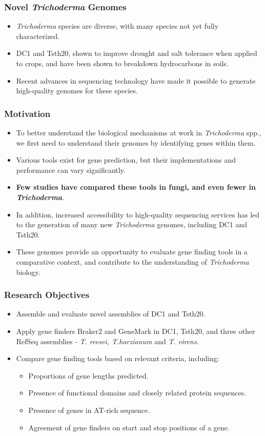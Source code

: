 \documentclass[t]{beamer}
\begin{document}
\begin{frame}
	\frametitle{Novel \textit{Trichoderma} Genomes}
	\begin{itemize}
		\item \textit{Trichoderma} species are diverse, with many species not yet fully characterized.
		\item DC1 and Tsth20, shown to improve drought and salt tolerance when applied to crops, and have been shown to breakdown hydrocarbons in soils.
		\item Recent advances in sequencing technology have made it possible to generate high-quality genomes for these species.
	\end{itemize}
\end{frame}

\begin{frame}
	\frametitle{Motivation} 
	\begin{itemize}
		\item To better understand the biological mechanisms at work in \textit{Trichoderma} spp., we first need to understand their genomes by identifying genes within them.
		\item Various tools exist for gene prediction, but their implementations and performance can vary significantly.
		\item \textbf{Few studies have compared these tools in fungi, and even fewer in \textit{Trichoderma}}.
		\item In addition, increased accessibility to high-quality sequencing services has led to the generation of many new \textit{Trichoderma} genomes, including DC1 and Tsth20.
		\item These genomes provide an opportunity to evaluate gene finding tools in a comparative context, and contribute to the understanding of \textit{Trichoderma} biology. 
	\end{itemize}
\end{frame}

\begin{frame}
	\frametitle{Research Objectives}
	\begin{itemize}
		\item Assemble and evaluate novel assemblies of DC1 and Tsth20.
		\item Apply gene finders Braker2 and GeneMark in DC1, Tsth20, and three other RefSeq assemblies - \textit{T. reesei, T.harzianum} and \textit{T. virens}.
		\item Compare gene finding tools based on relevant criteria, including:
		\begin{itemize}
			 \item Proportions of gene lengths predicted.
			 \item Presence of functional domains and closely related protein sequences.
			 \item Presence of genes in AT-rich sequence.
			 \item Agreement of gene finders on start and stop positions of a gene. 
		\end{itemize}
	\end{itemize}
\end{frame}
\end{document}
